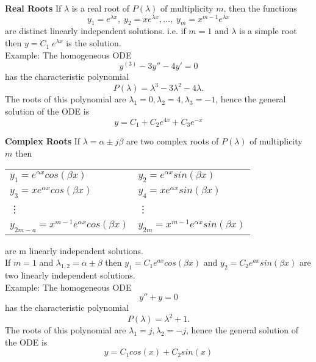 \textbf{Real Roots}
If $\lambda$ is a real root of $P(\lambda)$ of multiplicity $m$, then the functions
\begin{equation}
  y_1 =e^{\lambda x}, \;   y_2 =xe^{\lambda x} ,...,\;   y_m =x^{m-1}e^{\lambda x}
\end{equation}
are distinct linearly independent solutions. i.e. if $m = 1$ and $\lambda$ is a simple root then $y = C_1\; e^{\lambda x}$ is the solution.\\
Example: The homogeneous ODE
\begin{equation}
  y^{(3)}- 3y'' - 4y' = 0
\end{equation}
has the characteristic polynomial
\begin{equation}
  P(\lambda) = \lambda^3 - 3\lambda^2 - 4\lambda.
\end{equation}
The roots of this polynomial are $\lambda_1 = 0, \lambda_2 = 4, \lambda_3 = -1$, hence the general solution of
the ODE is
\begin{equation}
  y = C_1 + C_2 e^{4x} + C_3e^{-x}
\end{equation}

\textbf{Complex Roots}
If $\lambda = \alpha \pm j\beta$ are two complex roots of $P(\lambda)$ of multiplicity $m$ then
\begin{table}[H]
  \begin{tabular}{ll}
    $y_1 = e^{\alpha x} cos(\beta x)$ &   $y_2 = e^{\alpha x} sin(\beta x)$\\
    $y_3 = xe^{\alpha x} cos(\beta x)$ &   $y_4 = xe^{\alpha x} sin(\beta x)$\\
    \vdots  & \vdots \\
    $y_{2m-a} = x^{m-1}e^{\alpha x} cos(\beta x)$ &   $y_{2m} = x^{m-1}e^{\alpha x} sin(\beta x)$
  \end{tabular}
\end{table}
are m linearly independent solutions.\\
If $m = 1$ and $\lambda_{1,2} = \alpha \pm \beta$ then $y_1 = C_1 e^{ax}cos(\beta x)$ and $y_2 = C_2 e^{ax}sin(\beta x)$ are two linearly
independent solutions.\\
Example: The homogeneous ODE
\begin{equation}
  y'' + y = 0
\end{equation}
has the characteristic polynomial
\begin{equation}
  P(\lambda) = \lambda^2 + 1.
\end{equation}
The roots of this polynomial are $\lambda_1 = j, \lambda_2 = -j$, hence the general solution of the ODE is
\begin{equation}
  y = C_1 cos(x) + C_2 sin(x)
\end{equation}

